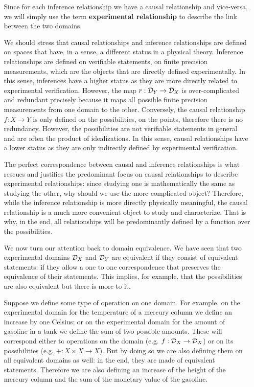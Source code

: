 Since for each inference relationship we have a causal relationship and vice-versa, we will simply use the term \textbf{experimental relationship} to describe the link between the two domains.

We should stress that causal relationships and inference relationships are defined on spaces that have, in a sense, a different status in a physical theory. Inference relationships are defined on verifiable statements, on finite precision measurements, which are the objects that are directly defined experimentally. In this sense, inferences have a higher status as they are more directly related to experimental verification. However, the map $r : \mathcal{D}_Y \to \mathcal{D}_X$ is over-complicated and redundant precisely because it maps all possible finite precision measurements from one domain to the other. Conversely, the causal relationship $f : X \to Y$ is only defined on the possibilities, on the points, therefore there is no redundancy. However, the possibilities are not verifiable statements in general and are often the product of idealizations. In this sense, causal relationships have a lower status as they are only indirectly defined by experimental verification.

The perfect correspondence between causal and inference relationships is what rescues and justifies the predominant focus on causal relationships to describe experimental relationships: since studying one is mathematically the same as studying the other, why should we use the more complicated object? Therefore, while the inference relationship is more directly physically meaningful, the causal relationship is a much more convenient object to study and characterize. That is why, in the end, all relationships will be predominantly defined by a function over the possibilities.

We now turn our attention back to domain equivalence. We have seen that two experimental domains $\mathcal{D}_X$ and $\mathcal{D}_Y$ are equivalent if they consist of equivalent statements: if they allow a one to one correspondence that preserves the equivalence of their statements. This implies, for example, that the possibilities are also equivalent but there is more to it.

Suppose we define some type of operation on one domain. For example, on the experimental domain for the temperature of a mercury column we define an increase by one Celsius; or on the experimental domain for the amount of gasoline in a tank we define the sum of two possible amounts. These will correspond either to operations on the domain (e.g. $f : \mathcal{D}_X \to \mathcal{D}_X$) or on its possibilities (e.g. $+ : X \times X \to X$). But by doing so we are also defining them on all equivalent domains as well: in the end, they are made of equivalent statements. Therefore we are also defining an increase of the height of the mercury column and the sum of the monetary value of the gasoline.

